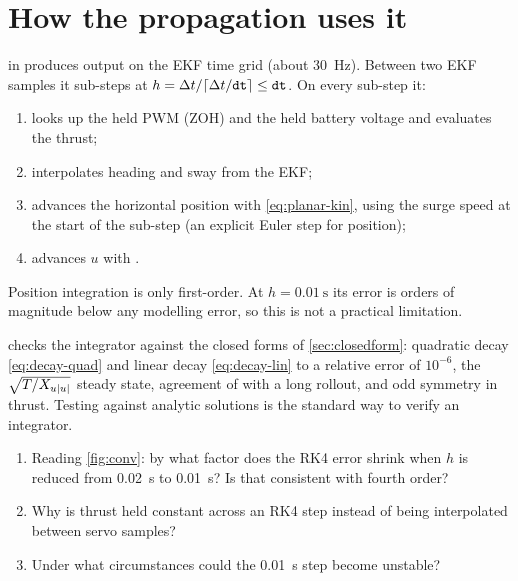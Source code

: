 \section{How the propagation uses it}

 in  produces output on the EKF time grid
(about \qty{30}{\hertz}). Between two EKF samples it sub-steps at
$h = \Delta t/\lceil \Delta t/\code{dt}\rceil \le \code{dt}$. On every sub-step it:
\begin{enumerate}
  \item looks up the held PWM (ZOH) and the held battery voltage and evaluates the thrust;
  \item interpolates heading and sway from the EKF;
  \item advances the horizontal position with \eqref{eq:planar-kin}, using the surge speed at
        the start of the sub-step (an explicit Euler step for position);
  \item advances $u$ with .
\end{enumerate}
Position integration is only first-order. At $h = \qty{0.01}{\second}$ its error is orders of
magnitude below any modelling error, so this is not a practical limitation.

\begin{incode}
 checks the integrator against the closed forms of
\cref{sec:closedform}: quadratic decay \eqref{eq:decay-quad} and linear decay \eqref{eq:decay-lin}
to a relative error of $10^{-6}$, the $\sqrt{T/X_{u|u|}}$ steady state, agreement of
 with a long rollout, and odd symmetry in thrust. Testing against
analytic solutions is the standard way to verify an integrator.
\end{incode}

\begin{questions}
\begin{enumerate}
  \item Reading \cref{fig:conv}: by what factor does the RK4 error shrink when $h$ is reduced
        from \qty{0.02}{\second} to \qty{0.01}{\second}? Is that consistent with fourth order?
  \item Why is thrust held constant across an RK4 step instead of being interpolated between
        servo samples?
  \item Under what circumstances could the \qty{0.01}{\second} step become unstable?
\end{enumerate}
\end{questions}
